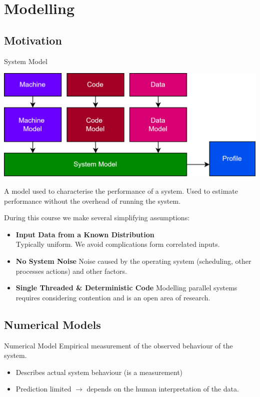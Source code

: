 \chapter{Modelling}

\section{Motivation}
\begin{definitionbox}{System Model}
    \begin{center}
        \includegraphics[width=.6\textwidth]{modelling/images/system_model.drawio.png}
    \end{center}
    A model used to characterise the performance of a system. Used to estimate performance without the overhead of running the system.
\end{definitionbox}

During this course we make several simplifying assumptions:
\begin{itemize}
    \item {\textbf{Input Data from a Known Distribution}
        \\ Typically uniform. We avoid complications form correlated inputs. 
    }
    \item {\textbf{No System Noise}
        Noise caused by the operating system  (scheduling, other processes actions) and other factors.
    }
    \item {\textbf{Single Threaded \& Deterministic Code}
        Modelling parallel systems requires considering contention and is an open area of research. 
    }
\end{itemize}

\section{Numerical Models}
\begin{definitionbox}{Numerical Model}
    Empirical measurement of the observed behaviour of the system.
    \begin{itemize}
        \item Describes actual system behaviour (is a measurement)
        \item Prediction limited $\to$ depends on the human interpretation of the data.
    \end{itemize}    
\end{definitionbox}


